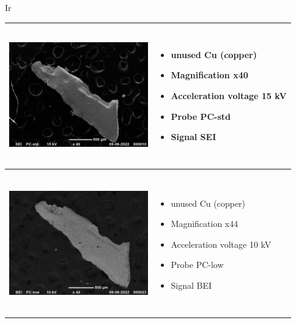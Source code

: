 Ir\documentclass{article}
\begin{document}
\begin{center}
\begin{longtable}
\begin{tabular}{ | m{7cm} | m{7cm} | }
      \\
    \begin{minipage}{.3\textwidth}
      \includegraphics[width=60mm, height=60mm]{pictures/cu4.jpg}
    \end{minipage}
    &
      \begin{itemize}
        \item unused Cu (copper)
        \item Magnification x40
        \item Acceleration voltage 15 kV
        \item Probe PC-std 
        \item Signal SEI 
      \end{itemize} \\ \hline
      \\
    \begin{minipage}{.3\textwidth}
      \includegraphics[width=60mm, height=60mm]{pictures/cu5.jpg}
    \end{minipage}
    &
      \begin{itemize}
        \item unused Cu (copper)
        \item Magnification x44
        \item Acceleration voltage 10 kV
        \item Probe PC-low
        \item Signal BEI
      \end{itemize} \\ \hline
      \end{tabular}
\end{longtable}
\end{center}
\end{document}
